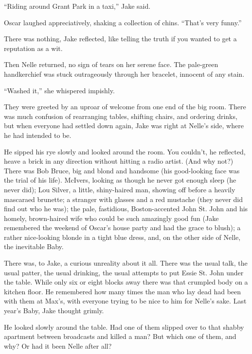 \documentclass{novel}
\begin{document}
“Riding around Grant Park in a taxi,” Jake said.

Oscar laughed appreciatively, shaking a collection of chins. “That’s very funny.”

There was nothing, Jake reflected, like telling the truth if you wanted to get a reputation as a wit.

Then Nelle returned, no sign of tears on her serene face. The pale-green handkerchief was stuck outrageously through her bracelet, innocent of any stain.

“Washed it,” she whispered impishly.

They were greeted by an uproar of welcome from one end of the big room. There was much confusion of rearranging tables, shifting chairs, and ordering drinks, but when everyone had settled down again, Jake was right at Nelle’s side, where he had intended to be.

He sipped his rye slowly and looked around the room. You couldn’t, he reflected, heave a brick in any direction without hitting a radio artist. (And why not?) There was Bob Bruce, big and blond and handsome (his good-looking face was the trial of his life). McIvers, looking as though he never got enough sleep (he never did); Lou Silver, a little, shiny-haired man, showing off before a heavily mascaraed brunette; a stranger with glasses and a red mustache (they never did find out who he was); the pale, fastidious, Boston-accented John St. John and his homely, brown-haired wife who could be such amazingly good fun (Jake remembered the weekend of Oscar’s house party and had the grace to blush); a rather nice-looking blonde in a tight blue dress, and, on the other side of Nelle, the inevitable Baby.

There was, to Jake, a curious unreality about it all. There was the usual talk, the usual patter, the usual drinking, the usual attempts to put Essie St. John under the table. While only six or eight blocks away there was that crumpled body on a kitchen floor. He remembered how many times the man who lay dead had been with them at Max’s, with everyone trying to be nice to him for Nelle’s sake. Last year’s Baby, Jake thought grimly.

He looked slowly around the table. Had one of them slipped over to that shabby apartment between broadcasts and killed a man? But which one of them, and why? Or had it been Nelle after all?

\vspace{2\nbs}
\clearpage
\thispagestyle{empty}
\end{document}
